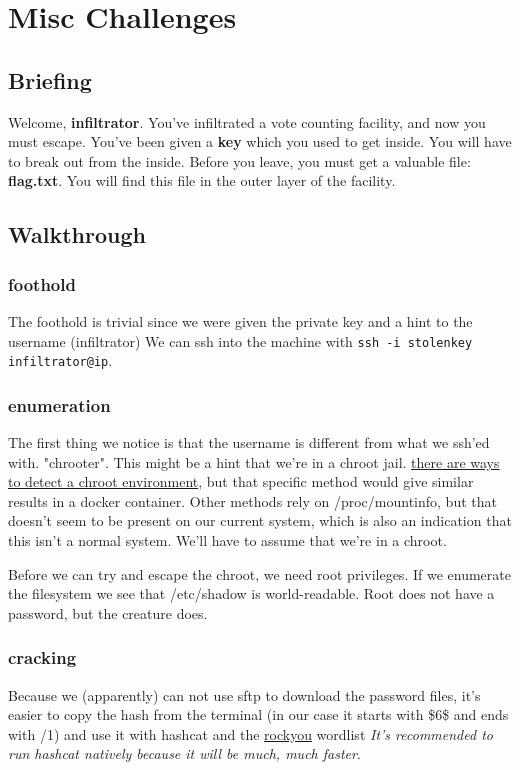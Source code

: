 \documentclass[../main.tex]{subfiles}
\begin{document}
\section{Misc Challenges}
\subsection{Briefing}
Welcome, \textbf{infiltrator}. You've infiltrated a vote counting facility, and now you must escape. You've been given a \textbf{key} which you used to get inside. You will have to break out from the inside. Before you leave, you must get a valuable file: \textbf{flag.txt}. You will find this file in the outer layer of the facility.

\subsection{Walkthrough}
\subsubsection{foothold}
The foothold is trivial since we were given the private key and a hint to the username (infiltrator)
We can ssh into the machine with \lstinline{ssh -i stolenkey infiltrator@ip}.
\subsubsection{enumeration}
The first thing we notice is that the username is different from what we ssh'ed with. "chrooter". This might be a hint that we're in a chroot jail. \href{https://stackoverflow.com/questions/75182/detecting-a-chroot-jail-from-within}{there are ways to detect a chroot environment}, but that specific method would give similar results in a docker container. Other methods rely on /proc/mountinfo, but that doesn't seem to be present on our current system, which is also an indication that this isn't a normal system. We'll have to assume that we're in a chroot.

Before we can try and escape the chroot, we need root privileges. If we enumerate the filesystem we see that /etc/shadow is world-readable. Root does not have a password, but the creature does. 

\subsubsection{cracking}
Because we (apparently) can not use sftp to download the password files, it's easier to copy the hash from the terminal (in our case it starts with \$6\$ and ends with /1) and use it with hashcat and the \href{https://github.com/brannondorsey/naive-hashcat/releases/download/data/rockyou.txt}{rockyou} wordlist \emph{It's recommended to run hashcat natively because it will be much, much faster}.
\end{document}
